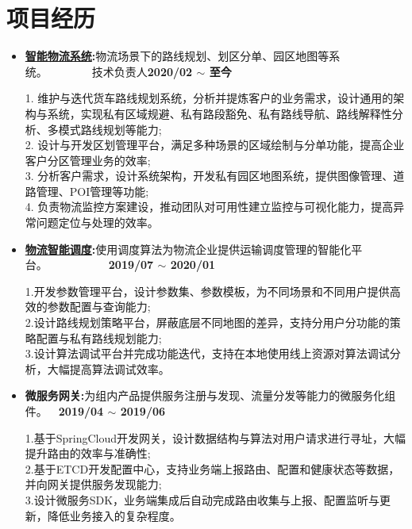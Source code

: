 \documentclass[letterpaper, UTF8, 11pt]{article}
\begin{document}
	\section*{\textbf{项目经历}}\vspace{-0.12in}
	\begin{itemize}	
		\item \textbf{\href{https://lbsyun.baidu.com/solutions/logisticsmap}{智能物流系统}:}{物流场景下的路线规划、划区分单、园区地图等系统。}~~~~~~~~技术负责人\textbf{2020/02 $\sim$ 至今}
		
		1. 维护与迭代货车路线规划系统，分析并提炼客户的业务需求，设计通用的架构与系统，实现私有区域规避、私有路段豁免、私有路线导航、路线解释性分析、多模式路线规划等能力;\\
		2. 设计与开发区划管理平台，满足多种场景的区域绘制与分单功能，提高企业客户分区管理业务的效率;\\
		3. 分析客户需求，设计系统架构，开发私有园区地图系统，提供图像管理、道路管理、POI管理等功能;\\
		4. 负责物流监控方案建设，推动团队对可用性建立监控与可视化能力，提高异常问题定位与处理的效率。
		
		\vspace{0.03in}

		\item \textbf{\href{https://lbsyun.baidu.com/solutions/scheduling}{物流智能调度}:}{使用调度算法为物流企业提供运输调度管理的智能化平台。}~~~~~~~~~~~\textbf{2019/07 $\sim$ 2020/01}
		
		1.开发参数管理平台，设计参数集、参数模板，为不同场景和不同用户提供高效的参数配置与查询能力;\\
		2.设计路线规划策略平台，屏蔽底层不同地图的差异，支持分用户分功能的策略配置与私有路线规划能力;\\
		3.设计算法调试平台并完成功能迭代，支持在本地使用线上资源对算法调试分析，大幅提高算法调试效率。
		
		\vspace{0.03in}

		\item \textbf{微服务网关:}{为组内产品提供服务注册与发现、流量分发等能力的微服务化组件。}~~\textbf{2019/04 $\sim$ 2019/06}
		
		1.基于SpringCloud开发网关，设计数据结构与算法对用户请求进行寻址，大幅提升路由的效率与准确性;\\
		2.基于ETCD开发配置中心，支持业务端上报路由、配置和健康状态等数据，并向网关提供服务发现能力;\\
		3.设计微服务SDK，业务端集成后自动完成路由收集与上报、配置监听与更新，降低业务接入的复杂程度。
		

\end{itemize}
\end{document}
